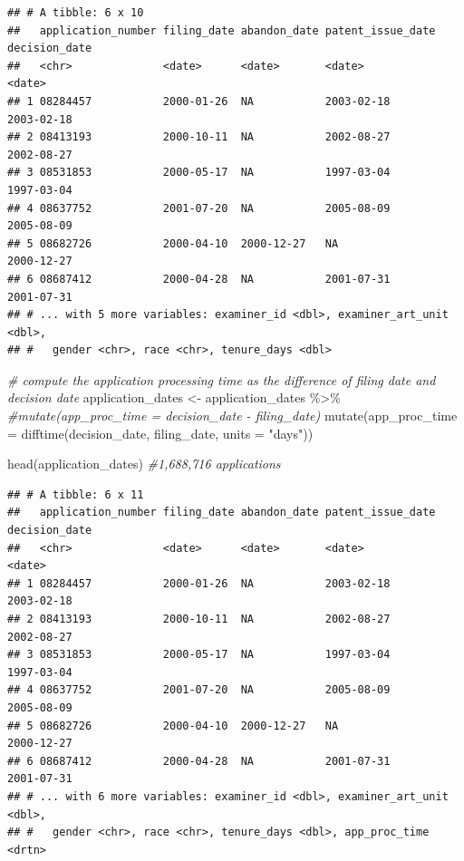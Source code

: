 \documentclass[
]{article}
\newenvironment{Shaded}{\begin{snugshade}}{\end{snugshade}}
\newcommand{\AttributeTok}[1]{\textcolor[rgb]{0.77,0.63,0.00}{#1}}
\newcommand{\CommentTok}[1]{\textcolor[rgb]{0.56,0.35,0.01}{\textit{#1}}}
\newcommand{\FunctionTok}[1]{\textcolor[rgb]{0.00,0.00,0.00}{#1}}
\newcommand{\NormalTok}[1]{#1}
\newcommand{\OtherTok}[1]{\textcolor[rgb]{0.56,0.35,0.01}{#1}}
\newcommand{\SpecialCharTok}[1]{\textcolor[rgb]{0.00,0.00,0.00}{#1}}
\newcommand{\StringTok}[1]{\textcolor[rgb]{0.31,0.60,0.02}{#1}}
\begin{document}
\begin{verbatim}
## # A tibble: 6 x 10
##   application_number filing_date abandon_date patent_issue_date decision_date
##   <chr>              <date>      <date>       <date>            <date>       
## 1 08284457           2000-01-26  NA           2003-02-18        2003-02-18   
## 2 08413193           2000-10-11  NA           2002-08-27        2002-08-27   
## 3 08531853           2000-05-17  NA           1997-03-04        1997-03-04   
## 4 08637752           2001-07-20  NA           2005-08-09        2005-08-09   
## 5 08682726           2000-04-10  2000-12-27   NA                2000-12-27   
## 6 08687412           2000-04-28  NA           2001-07-31        2001-07-31   
## # ... with 5 more variables: examiner_id <dbl>, examiner_art_unit <dbl>,
## #   gender <chr>, race <chr>, tenure_days <dbl>
\end{verbatim}

\begin{Shaded}
\begin{Highlighting}[]
\CommentTok{\# compute the application processing time as the difference of filing date and decision date}
\NormalTok{application\_dates }\OtherTok{\textless{}{-}}\NormalTok{ application\_dates }\SpecialCharTok{\%\textgreater{}\%} 
    \CommentTok{\#mutate(app\_proc\_time = decision\_date {-} filing\_date)}
    \FunctionTok{mutate}\NormalTok{(}\AttributeTok{app\_proc\_time =} \FunctionTok{difftime}\NormalTok{(decision\_date, filing\_date, }\AttributeTok{units =} \StringTok{"days"}\NormalTok{))}

\FunctionTok{head}\NormalTok{(application\_dates) }\CommentTok{\#1,688,716 applications}
\end{Highlighting}
\end{Shaded}

\begin{verbatim}
## # A tibble: 6 x 11
##   application_number filing_date abandon_date patent_issue_date decision_date
##   <chr>              <date>      <date>       <date>            <date>       
## 1 08284457           2000-01-26  NA           2003-02-18        2003-02-18   
## 2 08413193           2000-10-11  NA           2002-08-27        2002-08-27   
## 3 08531853           2000-05-17  NA           1997-03-04        1997-03-04   
## 4 08637752           2001-07-20  NA           2005-08-09        2005-08-09   
## 5 08682726           2000-04-10  2000-12-27   NA                2000-12-27   
## 6 08687412           2000-04-28  NA           2001-07-31        2001-07-31   
## # ... with 6 more variables: examiner_id <dbl>, examiner_art_unit <dbl>,
## #   gender <chr>, race <chr>, tenure_days <dbl>, app_proc_time <drtn>
\end{verbatim}
\end{document}
